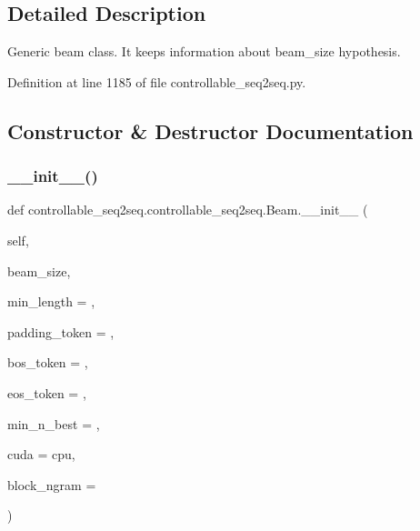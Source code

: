 \subsection{Detailed Description}
\begin{DoxyVerb}Generic beam class. It keeps information about beam_size hypothesis.\end{DoxyVerb}
 

Definition at line 1185 of file controllable\+\_\+seq2seq.\+py.



\subsection{Constructor \& Destructor Documentation}
\mbox{\label{classcontrollable__seq2seq_1_1controllable__seq2seq_1_1Beam_a10dd7af39b66b89f4ef0181c204452a8}} 
\subsubsection{\texorpdfstring{\+\_\+\+\_\+init\+\_\+\+\_\+()}{\_\_init\_\_()}}
{\footnotesize\ttfamily def controllable\+\_\+seq2seq.\+controllable\+\_\+seq2seq.\+Beam.\+\_\+\+\_\+init\+\_\+\+\_\+ (\begin{DoxyParamCaption}\item[{}]{self,  }\item[{}]{beam\+\_\+size,  }\item[{}]{min\+\_\+length = {},  }\item[{}]{padding\+\_\+token = {},  }\item[{}]{bos\+\_\+token = {},  }\item[{}]{eos\+\_\+token = {},  }\item[{}]{min\+\_\+n\+\_\+best = {},  }\item[{}]{cuda = {\ttfamily \textquotesingle{}cpu\textquotesingle{}},  }\item[{}]{block\+\_\+ngram = {} }\end{DoxyParamCaption})}

